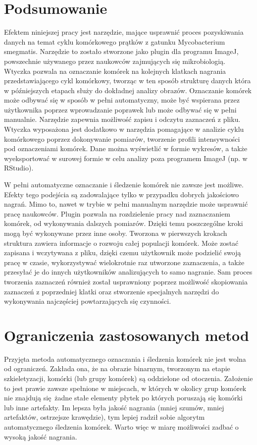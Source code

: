 \documentclass[declaration,shortabstract,mgr]{iithesis}
\begin{document}
\section{Podsumowanie}

Efektem niniejszej pracy jest narzędzie, mające usprawnić proces pozyskiwania danych na temat cyklu komórkowego prątków z gatunku Mycobacterium smegmatis.
Narzędzie to zostało stworzone jako plugin dla programu ImageJ, powszechnie używanego przez naukowców zajmujących się mikrobiologią.
Wtyczka pozwala na oznaczanie komórek na kolejnych klatkach nagrania przedstawiającego cykl komórkowy, tworząc w ten sposób strukturę danych która w późniejszych etapach służy do dokładnej analizy obrazów.
Oznaczanie komórek może odbywać się w sposób w pełni automatyczny, może być wspierana przez użytkownika poprzez wprowadzanie poprawek lub może odbywać się w pełni manualnie.
Narzędzie zapewnia możliwość zapisu i odczytu zaznaczeń z pliku.
Wtyczka wyposażona jest dodatkowo w narzędzia pomagające w analizie cyklu komórkowego poprzez dokonywanie pomiarów, tworzenie profili intensywności pod oznaczeniami komórek.
Dane można wyświetlić w formie wykresów, a także wyeksportować w surowej formie w celu analizy poza programem ImageJ (np. w RStudio).

W pełni automatyczne oznaczanie i śledzenie komórek nie zawsze jest możliwe.
Efekty tego podejścia są zadowalające tylko w przypadku dobrych jakościowo nagrań.
Mimo to, nawet w trybie w pełni manualnym narzędzie może usprawnić pracę naukowców.
Plugin pozwala na rozdzielenie pracy nad zaznaczaniem komórek, od wykonywania dalszych pomiarów.
Dzięki temu poszczególne kroki mogą być wykonywane przez inne osoby.
Tworzona w pierwszych krokach struktura zawiera informacje o rozwoju całej populacji komórek.
Może zostać zapisana i wczytywana z pliku, dzięki czemu użytkownik może podzielić swoją pracę w czasie, wykorzystywać wielokrotnie raz utworzone zaznaczenia, a także przesyłać je  do innych użytkowników analizujących to samo nagranie.
Sam proces tworzenia zaznaczeń również został usprawniony poprzez możliwość skopiowania zaznaczeń z poprzedniej klatki oraz stworzenie specjalnych narzędzi do wykonywania najczęściej powtarzających się czynności.

\section{Ograniczenia zastosowanych metod}

Przyjęta metoda automatycznego oznaczania i śledzenia komórek nie jest wolna od ograniczeń.
Zakłada ona, że na obrazie binarnym, tworzonym na etapie szkieletyzacji, komórki (lub grupy komórek) są oddzielone od otoczenia.
Założenie to jest prawie zawsze spełnione w miejscach, w których w okolicy grup komórek nie znajdują się żadne stałe elementy płytek po których poruszają się komórki lub inne artefakty.
Im lepsza była jakość nagrania (mniej szumów, mniej artefaktów, ostrzejsze krawędzie), tym lepiej radził sobie algorytm automatycznego śledzenia komórek.
Warto więc w miarę możliwości zadbać o wysoką jakość nagrania.
\end{document}
